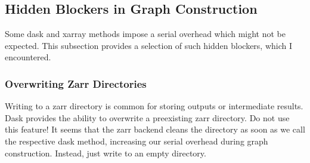 \subsection{Hidden Blockers in Graph Construction}

Some dask and xarray methods impose a serial overhead which might not be expected.
This subsection provides a selection of such hidden blockers, which I encountered.

\subsubsection{Overwriting Zarr Directories}
Writing to a zarr directory is common for storing outputs or intermediate results.
Dask provides the ability to overwrite a preexisting zarr directory.
Do not use this feature!
It seems that the zarr backend cleans the directory as soon as we call the respective dask method, increasing our serial overhead during graph construction.
Instead, just write to an empty directory.